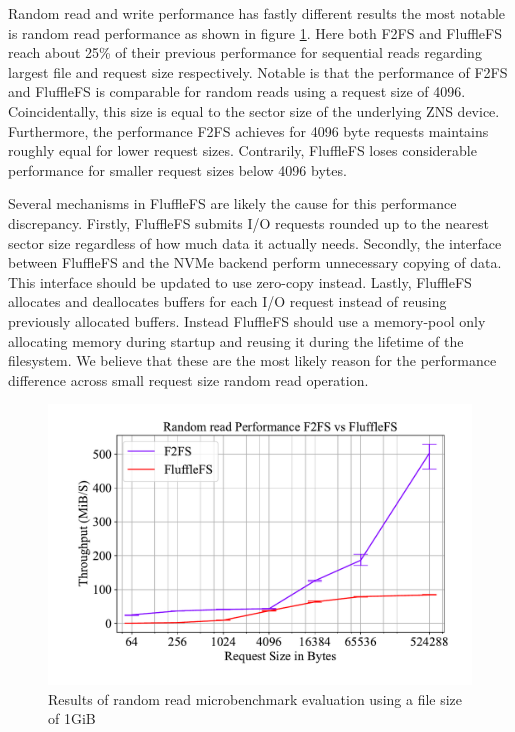 Random read and write performance has fastly different results the most notable
is random read performance as shown in figure \ref{figure:readrandom}. Here both
F2FS and FluffleFS reach about 25\% of their previous performance for sequential
reads regarding largest file and request size respectively. Notable is that
the performance of F2FS and FluffleFS is comparable for random reads using a
request size of 4096. Coincidentally, this size is equal to the sector size of
the underlying ZNS device. Furthermore, the performance F2FS achieves for 4096
byte requests maintains roughly equal for lower request sizes. Contrarily,
FluffleFS loses considerable performance for smaller request sizes below
4096 bytes.

Several mechanisms in FluffleFS are likely the cause for this performance
discrepancy. Firstly, FluffleFS submits I/O requests rounded up to the nearest
sector size regardless of how much data it actually needs. Secondly, the
interface between FluffleFS and the NVMe backend perform unnecessary copying of
data. This interface should be updated to use zero-copy instead. Lastly,
FluffleFS allocates and deallocates buffers for each I/O request instead of
reusing previously allocated buffers. Instead FluffleFS should use a memory-pool
only allocating memory during startup and reusing it during the lifetime of the
filesystem. We believe that these are the most likely reason for the
performance difference across small request size random read operation.

\begin{figure}[h]
    \centering
	\includegraphics[width=1\textwidth]{resources/images/results-random-read.pdf}
	\caption{Results of random read microbenchmark evaluation using a file size
        of 1GiB}
    \label{figure:readrandom}
\end{figure}

